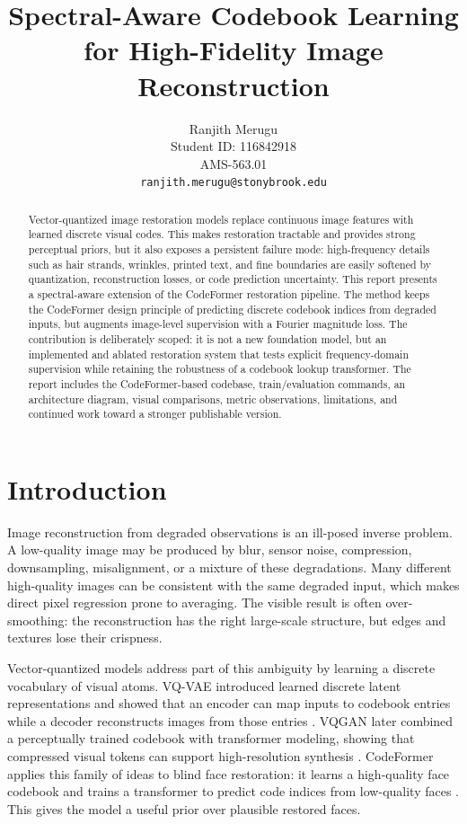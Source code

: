 \documentclass[10pt,twocolumn,letterpaper]{article}
\title{\vspace{-0.3in}\bf Spectral-Aware Codebook Learning for High-Fidelity Image Reconstruction}
\author{Ranjith Merugu\\
Student ID: 116842918\\
AMS-563.01\\
{\tt ranjith.merugu@stonybrook.edu}}
\date{}
\begin{document}
\maketitle

\begin{abstract}
Vector-quantized image restoration models replace continuous image features with learned discrete visual codes. This makes restoration tractable and provides strong perceptual priors, but it also exposes a persistent failure mode: high-frequency details such as hair strands, wrinkles, printed text, and fine boundaries are easily softened by quantization, reconstruction losses, or code prediction uncertainty. This report presents a spectral-aware extension of the CodeFormer restoration pipeline. The method keeps the CodeFormer design principle of predicting discrete codebook indices from degraded inputs, but augments image-level supervision with a Fourier magnitude loss. The contribution is deliberately scoped: it is not a new foundation model, but an implemented and ablated restoration system that tests explicit frequency-domain supervision while retaining the robustness of a codebook lookup transformer. The report includes the CodeFormer-based codebase, train/evaluation commands, an architecture diagram, visual comparisons, metric observations, limitations, and continued work toward a stronger publishable version.
\end{abstract}

\section{Introduction}
Image reconstruction from degraded observations is an ill-posed inverse problem. A low-quality image may be produced by blur, sensor noise, compression, downsampling, misalignment, or a mixture of these degradations. Many different high-quality images can be consistent with the same degraded input, which makes direct pixel regression prone to averaging. The visible result is often over-smoothing: the reconstruction has the right large-scale structure, but edges and textures lose their crispness.

Vector-quantized models address part of this ambiguity by learning a discrete vocabulary of visual atoms. VQ-VAE introduced learned discrete latent representations and showed that an encoder can map inputs to codebook entries while a decoder reconstructs images from those entries \cite{oord2017vqvae}. VQGAN later combined a perceptually trained codebook with transformer modeling, showing that compressed visual tokens can support high-resolution synthesis \cite{esser2021taming}. CodeFormer applies this family of ideas to blind face restoration: it learns a high-quality face codebook and trains a transformer to predict code indices from low-quality faces \cite{zhou2022codeformer}. This gives the model a useful prior over plausible restored faces.
\end{document}
